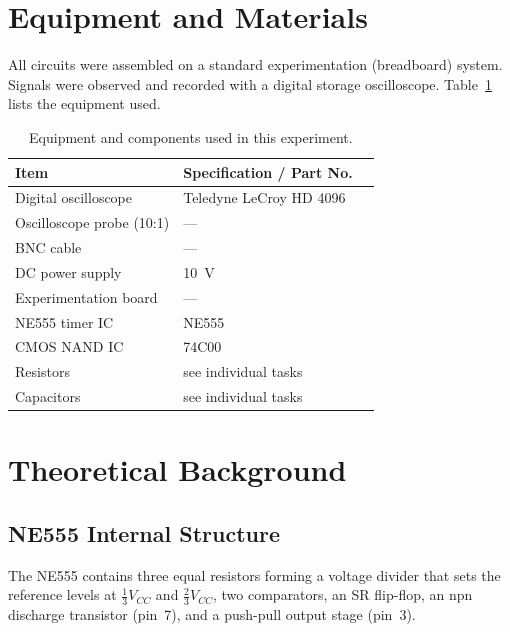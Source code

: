 \documentclass[12pt, a4paper]{article}
\begin{document}
\section{Equipment and Materials}

All circuits were assembled on a standard experimentation (breadboard) system.
Signals were observed and recorded with a digital storage oscilloscope.
Table~\ref{tab:equipment} lists the equipment used.

\begin{table}[H]
  \centering
  \caption{Equipment and components used in this experiment.}
  \label{tab:equipment}
  \begin{tabular}{llc}
    \toprule
    Item & Specification / Part No.\\
    \midrule
    Digital oscilloscope        & Teledyne LeCroy HD 4096\\
    Oscilloscope probe (10:1)   & ---\\
    BNC cable                   & ---\\
    DC power supply             & \SI{10}{\volt}\\
    Experimentation board       & ---\\
    NE555 timer IC              & NE555\\
    CMOS NAND IC                & 74C00\\
    Resistors                   & see individual tasks\\
    Capacitors                  & see individual tasks\\
    \bottomrule
  \end{tabular}
\end{table}

\section{Theoretical Background}

\subsection{NE555 Internal Structure}

The NE555 contains three equal resistors forming a voltage divider that sets the
reference levels at $\tfrac{1}{3}V_{CC}$ and $\tfrac{2}{3}V_{CC}$, two comparators,
an SR flip-flop, an npn discharge transistor (pin~7), and a push-pull output stage
(pin~3).
\end{document}
